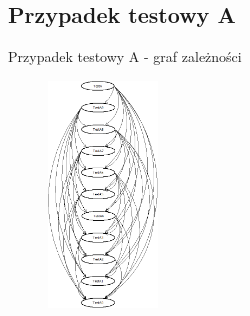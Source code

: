 \documentclass{beamer}
\begin{document}
\subsection*{Przypadek testowy A}

\begin{frame}{Przypadek testowy A - graf zależności}
\begin{figure}[H]
	\begin{center}
  		\includegraphics[height=6cm]{TestA.png}
	\end{center}
\end{figure}
\end{frame}
\end{document}
